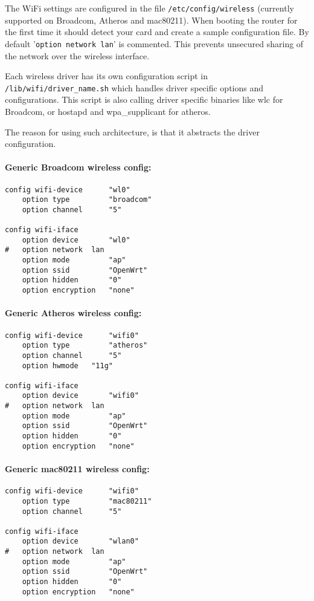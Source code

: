 The WiFi settings are configured in the file \texttt{/etc/config/wireless}
(currently supported on Broadcom, Atheros and mac80211). When booting the router for the first time
it should detect your card and create a sample configuration file. By default '\texttt{option network  lan}' is
commented. This prevents unsecured sharing of the network over the wireless interface.

Each wireless driver has its own configuration script in \texttt{/lib/wifi/driver\_name.sh} which handles
driver specific options and configurations. This script is also calling driver specific binaries like wlc for
Broadcom, or hostapd and wpa\_supplicant for atheros.

The reason for using such architecture, is that it abstracts the driver configuration. 

\paragraph{Generic Broadcom wireless config:}

\begin{Verbatim}
config wifi-device      "wl0"
    option type         "broadcom"
    option channel      "5"

config wifi-iface
    option device       "wl0"
#   option network  lan
    option mode         "ap"
    option ssid         "OpenWrt"
    option hidden       "0"
    option encryption   "none"
\end{Verbatim}

\paragraph{Generic Atheros wireless config:}

\begin{Verbatim}
config wifi-device      "wifi0"
    option type         "atheros"
    option channel      "5"
    option hwmode	"11g"

config wifi-iface
    option device       "wifi0"
#   option network  lan
    option mode         "ap"
    option ssid         "OpenWrt"
    option hidden       "0"
    option encryption   "none"
\end{Verbatim}

\paragraph{Generic mac80211 wireless config:}

\begin{Verbatim}
config wifi-device      "wifi0"
    option type         "mac80211"
    option channel      "5"

config wifi-iface
    option device       "wlan0"
#   option network  lan
    option mode         "ap"
    option ssid         "OpenWrt"
    option hidden       "0"
    option encryption   "none"
\end{Verbatim}

